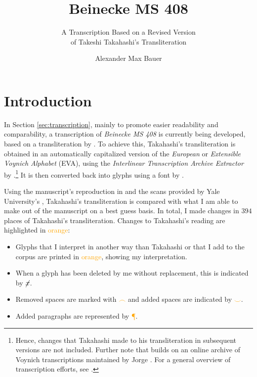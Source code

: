 \documentclass{scrarticle}
\title{Beinecke MS 408}
\subtitle{A Transcription Based on a Revised Version\\of Takeshi Takahashi's Transliteration}
\author{Alexander Max Bauer}
\date{}
\begin{document}
\maketitle

\clearpage
\tableofcontents


\clearpage
\section{Introduction}\label{sec:introduction}
In Section \ref{sec:transcription}, mainly to promote easier readability and comparability, a transcription of \textit{Beinecke MS 408} is currently being developed, based on a transliteration by \citet{takahashi_voynich_2004}.
To achieve this, Takahashi's transliteration is obtained in an automatically capitalized version of the \textit{European} or \textit{Extensible Voynich Alphabet} (EVA), using the \textit{Interlinear Transcription Archive Extractor} by \citet{schwerdtfeger_voynich_2004}.\footnote{Hence, changes that Takahashi made to his transliteration in subsequent versions are not included. Further note that \citet{schwerdtfeger_voynich_2004} builds on an online archive of Voynich transcriptions maintained by Jorge \citet{stolfi_voynich_1998}. For a general overview of transcription efforts, see \citet{zandbergen_text_2023}.}
It is then converted back into glyphs using a font by \citet{bettencourt_voynich_2019}.

Using the manuscript's reproduction in \citet{clemens_voynich_2016} and the scans provided by Yale University's \citet{beinecke_voynich_2004}, Takahashi's transliteration is compared with what I am able to make out of the manuscript on a best guess basis.
In total, I made changes in $394$ places of Takahashi's transliteration.
Changes to Takahashi's reading are highlighted in \textcolor{orange}{orange}:

\begin{itemize}
   \item Glyphs that I interpret in another way than Takahashi or that I add to the corpus are printed in \textcolor{orange}{orange}, showing my interpretation.
   \item When a glyph has been deleted by me without replacement, this is indicated by \textcolor{orange}{$\cancel{x}$}.
   \item Removed spaces are marked with \textcolor{orange}{$\frown$} and added spaces are indicated by \textcolor{orange}{$\smile$}.
   \item Added paragraphs are represented by \textcolor{orange}{{\P}}.
\end{itemize}
\end{document}
